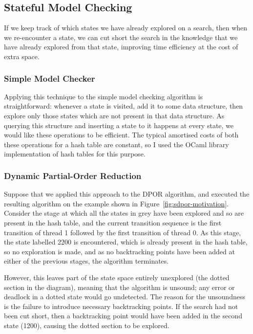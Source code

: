 \documentclass[12pt,a4paper,twoside,openany]{report}
\begin{document}
\subsection{Stateful Model Checking}
If we keep track of which states we have
already explored on a search, then when
we re-encounter a state, we can cut short
the search in the knowledge that we have
already explored from that state, improving
time efficiency at the cost of extra space.

\subsubsection{Simple Model Checker}

Applying this technique to the simple model
checking algorithm is straightforward: whenever
a state is visited, add it to some data structure,
then explore only those states which are not
present in that data structure. As querying
this structure and inserting a state to it
happens at every state, we would like these
operations to be efficient. The typical amortised costs
of both these operations for a hash table are
constant, so I used the OCaml library implementation
of hash tables for this purpose.

\subsubsection{Dynamic Partial-Order Reduction}
Suppose that we applied this approach
to the DPOR algorithm,
and executed the resulting algorithm
on the example shown in
Figure~\ref{fig:sdpor-motivation}.
Consider the stage at which
all the states in grey have been
explored and so are present in the hash table,
and the current transition sequence is the first
transition of thread 1 followed by the first
transition of thread 0. As this stage, the state
labelled 2200 is encountered, which is already
present in the hash table, so no exploration is
made, and as no backtracking points have been added
at either of the previous stages, the algorithm
terminates.

However, this leaves part of the state
space entirely unexplored (the dotted section in
the diagram), meaning that the algorithm is unsound;
any error or deadlock in a dotted state would go
undetected.
The reason for the unsoundness is the failure to
introduce necessary backtracking points. If the
search had not been cut short, then a backtracking point
would have been added in the second state (1200), causing the
dotted section to be explored.
\end{document}
